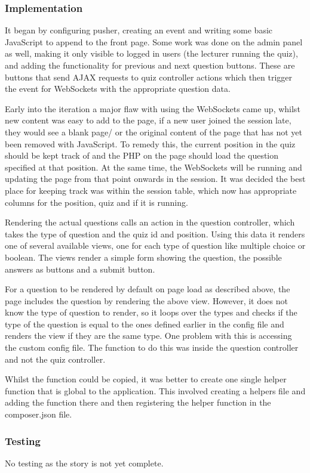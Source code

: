\subsubsection{Implementation}
It began by configuring pusher, creating an event and writing some basic JavaScript to append to the front page. Some work was done on the admin panel as well, making it only visible to logged in users (the lecturer running the quiz), and adding the functionality for previous and next question buttons. These are buttons that send AJAX requests to quiz controller actions which then trigger the event for WebSockets with the appropriate question data.

Early into the iteration a major flaw with using the WebSockets came up, whilst new content was easy to add to the page, if a new user joined the session late, they would see a blank page/ or the original content of the page that has not yet been removed with JavaScript. To remedy this, the current position in the quiz should be kept track of and the PHP on the page should load the question specified at that position. At the same time, the WebSockets will be running and updating the page from that point onwards in the session. It was decided the best place for keeping track was within the session table, which now has appropriate columns for the position, quiz and if it is running.

Rendering the actual questions calls an action in the question controller, which takes the type of question and the quiz id and position. Using this data it renders one of several available views, one for each type of question like multiple choice or boolean. The views render a simple form showing the question, the possible answers as buttons and a submit button.

For a question to be rendered by default on page load as described above, the page includes the question by rendering the above view. However, it does not know the type of question to render, so it loops over the types and checks if the type of the question is equal to the ones defined earlier in the config file and renders the view if they are the same type. One problem with this is accessing the custom config file. The function to do this was inside the question controller and not the quiz controller. 

Whilst the function could be copied, it was better to create one single helper function that is global to the application. This involved creating a helpers file and adding the function there and then registering the helper function in the composer.json file\cite{laravel-helper-function}.

\subsubsection{Testing}
No testing as the story is not yet complete.
\newpage
